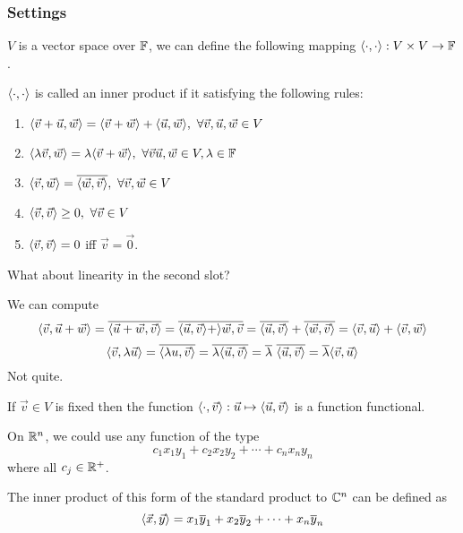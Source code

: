 \subsubsection*{Settings}
$V$ is a vector space over $\mathbb F$, we can define the following mapping $ \langle \cdot, \cdot \rangle : V \times V \to \mathbb F$.
\begin{definition}
$\langle \cdot, \cdot \rangle$ is called an inner product if it satisfying the following rules:
\begin{enumerate}
    \item $\langle \vec v + \vec u, \vec w \rangle = \langle \vec v + \vec w \rangle + \langle \vec u, \vec w \rangle, \ \forall \vec v, \vec u, \vec w \in V$
    \item $\langle \lambda \vec v, \vec w \rangle = \lambda \langle \vec v + \vec w \rangle, \ \forall \vec v \vec u, \vec w \in V, \lambda \in \mathbb F$
    \item $\langle \vec v, \vec w \rangle = \overline{\langle \vec w, \vec v \rangle}, \ \forall \vec v,\vec w \in V$
    \item $\la \vec v, \vec v \ra \geq 0, \ \forall \vec v \in V$
    \item $\langle \vec v, \vec v \rangle = 0$ iff $\vec v = \vec 0$.
\end{enumerate}
\end{definition}
\begin{question}
What about linearity in the second slot?
\end{question}
\begin{answer} We can compute
\[ \langle \vec v, \vec u + \vec w \rangle = \overline{\langle \vec u + \vec w, \vec v\rangle} = \overline{\langle \vec u, \vec v \rangle + \rangle \vec w, \vec v} = \overline{\langle \vec u, \vec v \rangle} + \overline{\langle \vec w, \vec v\rangle } = \langle \vec v, \vec u\rangle + \langle \vec v, \vec w\rangle\]
\[ \langle \vec v, \lambda \vec u\rangle = \overline{\langle \lambda u, \vec v\rangle} = \overline{\lambda \langle \vec u,\vec v\rangle} = \overline \lambda \ \overline{\langle \vec u, \vec v\rangle} = \overline \lambda \langle \vec v, \vec u \rangle\]
Not quite. \frownie{}
\end{answer}
\begin{remark}
    If $\vec v \in V$ is fixed then the function $\langle \cdot, \vec v \rangle : \vec u \mapsto \langle \vec u, \vec v \rangle$ is a function functional. 
\end{remark}
\begin{example}
    On $\mathbb R^n$, we could use any function of the type
    \[ c_1x_1y_1 + c_2x_2y_2 + \cdots + c_nx_ny_n\] where all $c_j \in \mathbb R^+$.
\end{example}
\begin{remark}[Generalization to $\b C^n$]
    The inner product of this form of the standard product to $\b C^n$ can be defined as
    \[ \langle \vec x, \vec y \rangle = x_1\overline y_1 + x_2\overline y_2 + \cdots + x_n\overline y_n\]
\end{remark}

